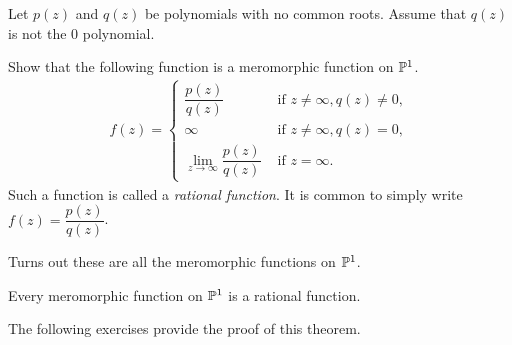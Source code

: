 \documentclass{article}
\begin{document}
    \begin{qbox}
      Let $p(z)$ and $q(z)$ be polynomials with no common roots. Assume that $q(z)$ is not the 0 polynomial.

      Show that the following function is a meromorphic function on $\mathbb{P}^1$.
      \begin{align*}
        f(z) = \begin{cases}
          \dfrac{p(z)}{q(z)} & \mbox{ if } z \neq \infty, q(z) \neq 0, \\
          \infty & \mbox{ if } z \neq \infty, q(z) = 0, \\
          \lim \limits_{z \rightarrow \infty} \dfrac{p(z)}{q(z)} & \mbox{ if } z = \infty.
      \end{cases}
      \end{align*}
      Such a function is called a \emph{rational function}. It is common to simply write $f(z) = \dfrac{p(z)}{q(z)}$.
    \end{qbox}

    Turns out these are all the meromorphic functions on $\mathbb{P}^1$.
    \begin{theorem}
      Every meromorphic function on $\mathbb{P}^1$ is a rational function.
    \end{theorem}
    The following exercises provide the proof of this theorem.
\end{document}
